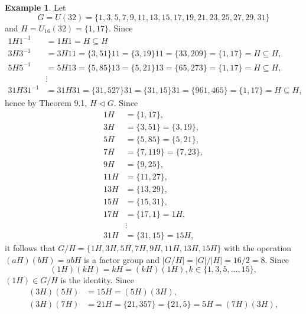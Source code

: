 \documentclass{article}
\theoremstyle{definition}
\newtheorem{example}{Example}[section]
\begin{document}
        
     \begin{example}
        Let 
        \begin{equation*}
            G = U(32) = \{1,3,5,7,9,11,13,15,17,19,21,23,25,27,29,31\}
        \end{equation*}
        and $H = U_{16}(32) = \{1,17\}$. Since
        \begin{align*}
            1H1^{-1} &= 1H1 = H \subseteq H \\
            3H3^{-1} &= 3H11 = \{3,51\}11 = \{3,19\}11 = \{33,209\} = \{1,17\} = H \subseteq H, \\
            5H5^{-1} &= 5H13 = \{5,85\}13 = \{5,21\}13 = \{65,273\} = \{1,17\} = H \subseteq H, \\
            & \vdots \\
            31H31^{-1} &= 31H31 = \{31,527\}31 = \{31,15\}31 = \{961,465\} = \{1,17\} = H \subseteq H,
        \end{align*}
        hence by Theorem 9.1, $H \lhd G$. Since
        \begin{align*}
            1H &= \{1,17\}, \\
            3H &= \{3,51\} = \{3,19\}, \\
            5H &= \{5,85\} = \{5,21\}, \\
            7H &= \{7,119\} = \{7,23\}, \\
            9H &= \{9,25\}, \\
            11H &= \{11,27\}, \\
            13H &= \{13,29\}, \\
            15H &= \{15,31\}, \\
            17H &= \{17,1\} = 1H, \\
            & \vdots \\
            31H &= \{31,15\} = 15H,
        \end{align*}
        it follows that $G/H = \{1H,3H,5H,7H,9H,11H,13H,15H\}$ with the operation $(aH)(bH) = abH$ is a factor group and $|G/H| = |G|/|H| = 16/2 = 8$. Since 
        \begin{equation*}
            (1H)(kH) = kH = (kH)(1H), k \in \{1,3,5,\dots,15\},
        \end{equation*}
        $(1H) \in G/H$ is the identity. Since
        \begin{align*}
            (3H)(5H) &= 15H = (5H)(3H), \\
            (3H)(7H) &= 21H = \{21,357\} = \{21,5\} = 5H = (7H)(3H), \\

\end{align*}
\end{example}
\end{document}
